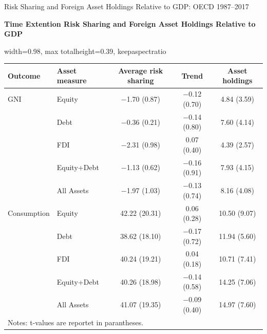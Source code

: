 \documentclass[aspectratio=169, 10pt]{beamer}
\begin{document}
\begin{frame}[t]{Risk Sharing and Foreign Asset Holdings Relative to GDP: OECD 1987--2017}
\centering

\begingroup
\tiny
\setlength{\tabcolsep}{2pt}
\renewcommand{\arraystretch}{0.62}

\vspace{0.03cm}

{\scriptsize \textbf{Time Extention Risk Sharing and Foreign Asset Holdings Relative to GDP}}

\vspace{0.04cm}

\begin{adjustbox}{
  width=0.98\textwidth,
  max totalheight=0.39\textheight,
  keepaspectratio
}
\begin{tabular}{llccc}
\hline\hline
Outcome & Asset measure & Average risk sharing & Trend & Asset holdings \\
\hline
GNI         & Equity       & $-$1.70 (0.87) & $-$0.12 (0.70) & 4.84 (3.59)  \\
            & Debt         & $-$0.36 (0.21) & $-$0.14 (0.80) & 7.60 (4.14)  \\
            & FDI          & $-$2.31 (0.98) & 0.07 (0.40)    & 4.39 (2.57)  \\
            & Equity+Debt  & $-$1.13 (0.62) & $-$0.16 (0.91) & 7.93 (4.15)  \\
            & All Assets   & $-$1.97 (1.03) & $-$0.13 (0.74) & 8.16 (4.08)  \\
\hline
Consumption & Equity       & 42.22 (20.31)  & 0.06 (0.28)    & 10.50 (9.07) \\
            & Debt         & 38.62 (18.10)  & $-$0.17 (0.72) & 11.94 (5.60) \\
            & FDI          & 40.24 (19.21)  & 0.04 (0.18)    & 10.71 (7.41) \\
            & Equity+Debt  & 40.26 (18.98)  & $-$0.14 (0.58) & 14.25 (7.06) \\
            & All Assets   & 41.07 (19.35)  & $-$0.09 (0.40) & 14.97 (7.60) \\
\hline\hline
  \multicolumn{5}{l}{\footnotesize Notes: t-values are reportet in parantheses.} \\
\end{tabular}
\end{adjustbox}

\vspace{0.10cm}


\end{frame}
\end{document}
